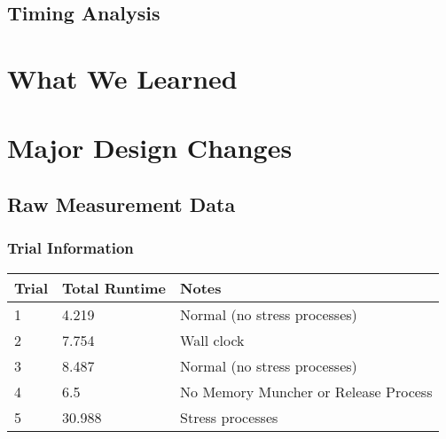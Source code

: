 \documentclass[12pt]{report}
\begin{document}
\chapter{Timing Analysis}

\part{What We Learned}

\part{Major Design Changes}


\appendix
\chapter{Raw Measurement Data}
\label{appendix:raw_data}

\section{Trial Information}

\begin{tabular}{l | l | l}
    Trial&Total Runtime&Notes \\
    \hline
    1&4.219&Normal (no stress processes) \\
    2&7.754&Wall clock \\
    3&8.487&Normal (no stress processes)\\
    4&6.5&No Memory Muncher or Release Process \\
    5&30.988&Stress processes \\
\end{tabular}
\end{document}
